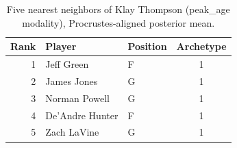 \begin{table}[htbp]
  \centering\small
  \begin{tabular}{rllc}
    \toprule
    Rank & Player & Position & Archetype \\
    \midrule
    1 & Jeff Green & F & 1 \\
    2 & James Jones & G & 1 \\
    3 & Norman Powell & G & 1 \\
    4 & De'Andre Hunter & F & 1 \\
    5 & Zach LaVine & G & 1 \\
    \bottomrule
  \end{tabular}
  \caption{Five nearest neighbors of Klay Thompson (peak_age modality), Procrustes-aligned posterior mean.}
  \label{tab:Klay_Thompson_neighbors_peak_age}
\end{table}

